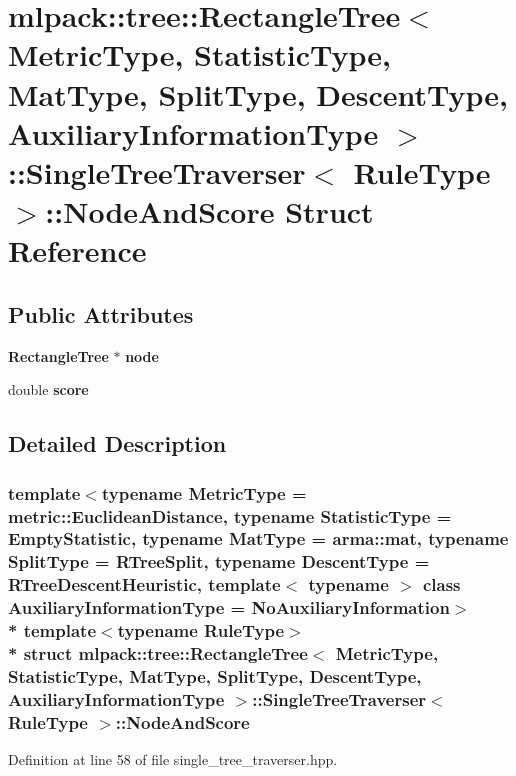 \section{mlpack\+:\+:tree\+:\+:Rectangle\+Tree$<$ Metric\+Type, Statistic\+Type, Mat\+Type, Split\+Type, Descent\+Type, Auxiliary\+Information\+Type $>$\+:\+:Single\+Tree\+Traverser$<$ Rule\+Type $>$\+:\+:Node\+And\+Score Struct Reference}
\label{structmlpack_1_1tree_1_1RectangleTree_1_1SingleTreeTraverser_1_1NodeAndScore}
\subsection*{Public Attributes}
\begin{DoxyCompactItemize}
\item 
{\bf Rectangle\+Tree} $\ast$ {\bf node}
\item 
double {\bf score}
\end{DoxyCompactItemize}


\subsection{Detailed Description}
\subsubsection*{template$<$typename Metric\+Type = metric\+::\+Euclidean\+Distance, typename Statistic\+Type = Empty\+Statistic, typename Mat\+Type = arma\+::mat, typename Split\+Type = R\+Tree\+Split, typename Descent\+Type = R\+Tree\+Descent\+Heuristic, template$<$ typename $>$ class Auxiliary\+Information\+Type = No\+Auxiliary\+Information$>$\\*
template$<$typename Rule\+Type$>$\\*
struct mlpack\+::tree\+::\+Rectangle\+Tree$<$ Metric\+Type, Statistic\+Type, Mat\+Type, Split\+Type, Descent\+Type, Auxiliary\+Information\+Type $>$\+::\+Single\+Tree\+Traverser$<$ Rule\+Type $>$\+::\+Node\+And\+Score}



Definition at line 58 of file single\+\_\+tree\+\_\+traverser.\+hpp.



